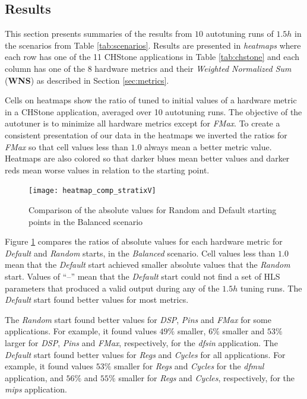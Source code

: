 \subsection{Results}
\label{sec:FPGAresults}

This section presents summaries of the results from $10$ autotuning runs of
$1.5h$ in the scenarios from Table \ref{tab:scenarios}.  Results are presented
in \textit{heatmaps} where each row has one of the 11 CHStone applications in
Table \ref{tab:chstone} and each column has one of the 8 hardware metrics and
their \textit{Weighted Normalized Sum} (\textbf{WNS}) as described in Section
\ref{sec:metrics}.

Cells on heatmaps show the ratio of tuned to initial values of a hardware
metric in a CHStone application, averaged over 10 autotuning runs. The
objective of the autotuner is to minimize all hardware metrics except for
\textit{FMax}.  To create a consistent presentation of our data in the heatmaps
we inverted the ratios for \textit{FMax} so that cell values less than $1.0$
always mean a better metric value.  Heatmaps are also colored so that darker
blues mean better values and darker reds mean worse values in relation to the
starting point.

\begin{figure}[htpb]
    \centering
    \texttt{[image: heatmap\_comp\_stratixV]}
    \caption{Comparison of the absolute values for Random and Default starting points in the Balanced scenario}
    \label{fig:comp}
\end{figure}

Figure \ref{fig:comp} compares the ratios of absolute values for each hardware
metric for \textit{Default} and \textit{Random} starts, in the
\textit{Balanced} scenario.  Cell values less than $1.0$ mean that the
\textit{Default} start achieved smaller absolute values that the
\textit{Random} start.  Values of ``--'' mean that the \textit{Default} start
could not find a set of HLS parameters that produced a valid output during any
of the $1.5h$ tuning runs. The \textit{Default} start found better values for
most metrics.

The \textit{Random} start found better values for \textit{DSP}, \textit{Pins}
and \textit{FMax} for some applications. For example, it found values $49\%$
smaller, $6\%$ smaller and $53\%$ larger for \textit{DSP}, \textit{Pins} and
\textit{FMax}, respectively, for the \textit{dfsin} application. The
\textit{Default} start found better values for \textit{Regs} and
\textit{Cycles} for all applications. For example, it found values $53\%$
smaller for \textit{Regs} and \textit{Cycles} for the \textit{dfmul}
application, and $56\%$ and $55\%$ smaller for \textit{Regs} and
\textit{Cycles}, respectively, for the \textit{mips} application.

